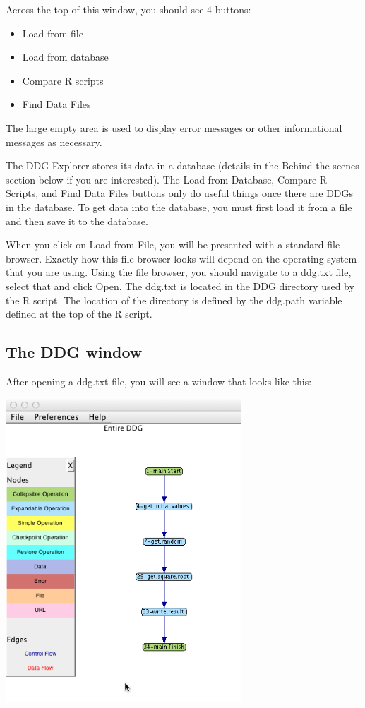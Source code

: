 \documentclass[12pt]{article}
\newcommand\liststyleWWviiiNumii{%
\renewcommand\labelitemi{•}
\renewcommand\labelitemii{•}
\renewcommand\labelitemiii{•}
\renewcommand\labelitemiv{•}
}
\begin{document}
{{\mdseries\upshape\color{black}
Across the top of this window, you should see 4 buttons:}

\liststyleWWviiiNumii
\begin{itemize}
\item {\color{black}
Load from file}
\item {\color{black}
Load from database}
\item {\color{black}
Compare R scripts}
\item {\color{black}
Find Data Files}
\end{itemize}
{\mdseries\upshape\color{black}
The large empty area is used to display error messages or other informational messages as necessary.}

{\mdseries\upshape\color{black}
The DDG Explorer stores its data in a database (details in the Behind the scenes section below if you are interested). The Load from Database, Compare R Scripts, and Find Data Files buttons only do useful things once there are DDGs in the database. To get data into the database, you must first load it from a file and then save it to the database.}

{\mdseries\upshape\color{black}
When you click on Load from File, you will be presented with a standard file browser. Exactly how this file browser looks will depend on the operating system that you are using. Using the file browser, you should navigate to a ddg.txt file, select that and click Open. The ddg.txt is located in the DDG directory used by the R script. The location of the directory is defined by the ddg.path variable defined at the top of the R script.}

\subsection{The DDG window}
{\mdseries\upshape\color{black}
After opening a ddg.txt file, you will see a window that looks like this:}

 \includegraphics[width=3.472in,height=4.4866in]{UsingDDGExplorer-img/UsingDDGExplorer-img002.png} 

}
\end{document}
